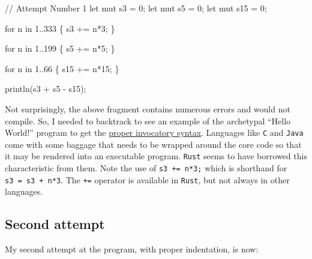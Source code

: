 \documentclass[
  a4paper,
]{article}
\newenvironment{Shaded}{\begin{snugshade}}{\end{snugshade}}
\newcommand{\CommentTok}[1]{\textcolor[rgb]{0.50,0.62,0.50}{#1}}
\newcommand{\ControlFlowTok}[1]{\textcolor[rgb]{0.94,0.87,0.69}{#1}}
\newcommand{\DecValTok}[1]{\textcolor[rgb]{0.86,0.86,0.80}{#1}}
\newcommand{\KeywordTok}[1]{\textcolor[rgb]{0.94,0.87,0.69}{#1}}
\newcommand{\NormalTok}[1]{\textcolor[rgb]{0.80,0.80,0.80}{#1}}
\newcommand{\OperatorTok}[1]{\textcolor[rgb]{0.94,0.94,0.82}{#1}}
\begin{document}
\begin{Shaded}
\begin{Highlighting}[]
\CommentTok{// Attempt Number 1}
    \KeywordTok{let} \KeywordTok{mut}\NormalTok{ s3 }\OperatorTok{=} \DecValTok{0}\OperatorTok{;}
    \KeywordTok{let} \KeywordTok{mut}\NormalTok{ s5 }\OperatorTok{=} \DecValTok{0}\OperatorTok{;}
    \KeywordTok{let} \KeywordTok{mut}\NormalTok{ s15 }\OperatorTok{=} \DecValTok{0}\OperatorTok{;}

    \ControlFlowTok{for}\NormalTok{ n }\KeywordTok{in} \DecValTok{1}\OperatorTok{..}\DecValTok{333} \OperatorTok{\{}
\NormalTok{      s3 }\OperatorTok{+=}\NormalTok{ n}\OperatorTok{*}\DecValTok{3}\OperatorTok{;}
    \OperatorTok{\}}

    \ControlFlowTok{for}\NormalTok{ n }\KeywordTok{in} \DecValTok{1}\OperatorTok{..}\DecValTok{199} \OperatorTok{\{}
\NormalTok{      s5 }\OperatorTok{+=}\NormalTok{ n}\OperatorTok{*}\DecValTok{5}\OperatorTok{;}
    \OperatorTok{\}}

    \ControlFlowTok{for}\NormalTok{ n }\KeywordTok{in} \DecValTok{1}\OperatorTok{..}\DecValTok{66} \OperatorTok{\{}
\NormalTok{      s15 }\OperatorTok{+=}\NormalTok{ n}\OperatorTok{*}\DecValTok{15}\OperatorTok{;}
    \OperatorTok{\}}

\NormalTok{    println(s3 }\OperatorTok{+}\NormalTok{ s5 }\OperatorTok{{-}}\NormalTok{ s15)}\OperatorTok{;}
\end{Highlighting}
\end{Shaded}

Not surprisingly, the above fragment contains numerous errors and would
not compile. So, I needed to backtrack to see an example of the
archetypal ``Hello World!'' program to get the
\href{https://doc.rust-lang.org/book/ch01-02-hello-world.html}{proper
invocatory syntax}. Languages like \texttt{C} and \texttt{Java} come
with some baggage that needs to be wrapped around the core code so that
it may be rendered into an executable program. \texttt{Rust} seems to
have borrowed this characteristic from them. Note the use of
\texttt{s3\ +=\ n*3;} which is shorthand for \texttt{s3\ =\ s3\ +\ n*3}.
The \texttt{+=} operator is available in \texttt{Rust}, but not always
in other languages.

\hypertarget{second-attempt}{%
\subsection{Second attempt}\label{second-attempt}}

My second attempt at the program, with proper indentation, is now:
\end{document}
